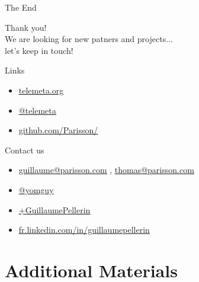 \documentclass[final, hyperref, table]{beamer}
\newcommand{\chref}[2]{
    \href{#1}{\color{rouge}\underline{#2}}
}
\begin{document}
\begin{frame}{The End}
 \begin{center}
   \large{Thank you!}\\
   \large{We are looking for new patners and projects...\\ let's keep in touch!}   
    \begin{block}{Links}
     \begin{itemize}\small
        \item \chref{http://telemeta.org}{telemeta.org}
        \item \chref{https://twitter.com/telemeta/}{@telemeta}
        \item \chref{http://github.com/Parisson/}{github.com/Parisson/}
    \end{itemize}
    \end{block}
    \begin{block}{Contact us}
    \begin{itemize}\small
    \item \chref{mailto:guillaume@parisson.com}{guillaume@parisson.com}, \chref{mailto:thomas@parisson.com}{thomas@parisson.com}
    \item \chref{https://twitter.com/yomguy/}{@yomguy}
    \item \chref{https://plus.google.com/u/0/+GuillaumePellerin/posts}{+GuillaumePellerin}
    \item \chref{http://fr.linkedin.com/in/guillaumepellerin}{fr.linkedin.com/in/guillaumepellerin}
    \end{itemize}
     \end{block}
  \end{center}
\end{frame}

\appendix
\section{Additional Materials}
\end{document}
